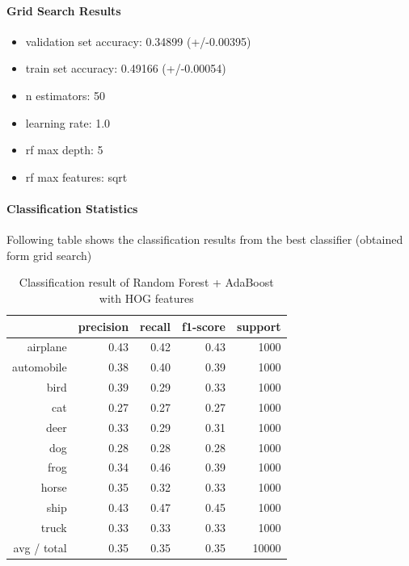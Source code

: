 \documentclass[12pt]{article}
\begin{document}
\paragraph{Grid Search Results}
\begin{itemize}
\item validation set accuracy: 0.34899 (+/-0.00395) 
\item train set accuracy: 0.49166 (+/-0.00054)
\item n estimators: 50 
\item learning rate: 1.0
\item rf max depth: 5
\item rf max features: sqrt
\end{itemize}
\paragraph{Classification Statistics}
Following table shows the classification results from the best classifier (obtained form grid search) \\
\begin{table}[H]
\centering
\begin{tabular}{| r | r | r | r | r |}
\hline
    & precision &   recall & f1-score &  support\\
 \hline
   airplane    &   0.43    &  0.42   &   0.43    &  1000\\
 automobile&       0.38     & 0.40    &  0.39  &    1000\\
       bird    &   0.39   &   0.29   &   0.33   &   1000\\
        cat   &    0.27    &  0.27   &   0.27   &   1000\\
       deer  &     0.33   &   0.29   &   0.31   &   1000\\
        dog  &     0.28   &   0.28    &  0.28    &  1000\\
       frog    &   0.34   &   0.46    &  0.39    &  1000\\
      horse   &    0.35 &     0.32   &   0.33  &    1000\\
       ship    &   0.43   &   0.47    &  0.45    &  1000\\
      truck     &  0.33   &   0.33    &  0.33    &  1000\\
\hline
avg / total     &  0.35 &     0.35 &     0.35 &    10000\\
\hline
\end{tabular}
\caption{Classification result of Random Forest + AdaBoost with HOG features}
\label{tab:rf_cs_hog}
\end{table}
\end{document}
